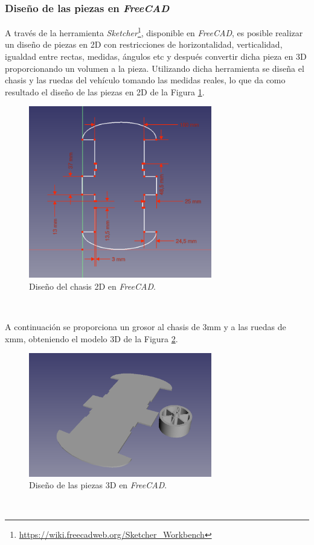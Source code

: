 \subsubsection{Diseño de las piezas en \textit{FreeCAD}}

A través de la herramienta \textit{Sketcher}\footnote{\url{https://wiki.freecadweb.org/Sketcher_Workbench}}, disponible en \textit{FreeCAD}, es posible realizar un diseño de
piezas en 2D con restricciones de horizontalidad, verticalidad, igualdad entre rectas, medidas, ángulos etc y después convertir dicha pieza en 3D proporcionando un volumen a la
pieza. Utilizando dicha herramienta se diseña el chasis y las ruedas del vehículo tomando las medidas reales, lo que da como resultado el diseño de las piezas en 2D de la Figura
\ref{fig:design2Dfreecad}.\\

\begin{figure} [h!]
	\begin{center}
		\includegraphics[width=8cm]{figs/sketchFreecad}
	\end{center}
	\caption{Diseño del chasis 2D en \textit{FreeCAD}.}
	\label{fig:design2Dfreecad}
\end{figure}\

A continuación se proporciona un grosor al chasis de 3mm y a las ruedas de xmm, obteniendo el modelo 3D de la Figura \ref{fig:design3Dfreecad}.\\

\begin{figure} [h!]
	\begin{center}
		\includegraphics[width=8cm]{figs/freecad}
	\end{center}
	\caption{Diseño de las piezas 3D en \textit{FreeCAD}.}
	\label{fig:design3Dfreecad}
\end{figure}\

